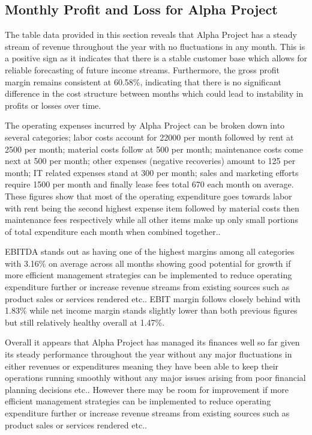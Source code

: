 

\subsection{Monthly Profit and Loss for Alpha Project}\label{sec:title}


The table data provided in this section reveals that Alpha Project has a steady stream of revenue throughout the year with no fluctuations in any month. This is a positive sign as it indicates that there is a stable customer base which allows for reliable forecasting of future income streams. Furthermore, the gross profit margin remains consistent at 60.58\%, indicating that there is no significant difference in the cost structure between months which could lead to instability in profits or losses over time. 

The operating expenses incurred by Alpha Project can be broken down into several categories; labor costs account for 22000 per month followed by rent at 2500 per month; material costs follow at 500 per month; maintenance costs come next at 500 per month; other expenses (negative recoveries) amount to 125 per month; IT related expenses stand at 300 per month; sales and marketing efforts require 1500 per month and finally lease fees total 670 each month on average. These figures show that most of the operating expenditure goes towards labor with rent being the second highest expense item followed by material costs then maintenance fees respectively while all other items make up only small portions of total expenditure each month when combined together.. 

EBITDA stands out as having one of the highest margins among all categories with 3.16\% on average across all months showing good potential for growth if more efficient management strategies can be implemented to reduce operating expenditure further or increase revenue streams from existing sources such as product sales or services rendered etc.. EBIT margin follows closely behind with 1.83\% while net income margin stands slightly lower than both previous figures but still relatively healthy overall at 1.47\%.  

Overall it appears that Alpha Project has managed its finances well so far given its steady performance throughout the year without any major fluctuations in either revenues or expenditures meaning they have been able to keep their operations running smoothly without any major issues arising from poor financial planning decisions etc.. However there may be room for improvement if more efficient management strategies can be implemented to reduce operating expenditure further or increase revenue streams from existing sources such as product sales or services rendered etc..